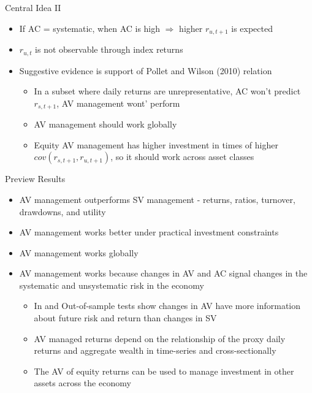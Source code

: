 \documentclass{beamer}
\begin{document}
\begin{frame}{Central Idea II}
	\begin{itemize}[<+->]
		\item If AC = systematic, when AC is high $\Rightarrow$ higher $r_{u,t+1}$ is expected
		\item $r_{u,t}$ is not observable through index returns
		\item Suggestive evidence is support of Pollet and Wilson (2010) relation
		\begin{itemize}[<+->]
			\item In a subset where daily returns are unrepresentative, AC won't predict $r_{s,t+1}$, AV management wont' perform
			\item AV management should work globally
			\item Equity AV management has higher investment in times of higher $cov(r_{s,t+1},r_{u,t+1})$, so it should work across asset classes
		\end{itemize}
	\end{itemize}
\end{frame}

\begin{frame}{Preview Results}
	\begin{itemize}[<+->]
		\item AV management outperforms SV management - returns, ratios, turnover, drawdowns, and utility
		\item AV management works better under practical investment constraints
		\item AV management works globally
		\item AV management works because changes in AV and AC signal changes in the systematic and unsystematic risk in the economy
		\begin{itemize}[<+->]
			\item In and Out-of-sample tests show changes in AV have more information about future risk and return than changes in SV
			\item AV managed returns depend on the relationship of the proxy daily returns and aggregate wealth in time-series and cross-sectionally
			\item The AV of equity returns can be used to manage investment in other assets across the economy
		\end{itemize}
		
	\end{itemize}
\end{frame}
\end{document}
